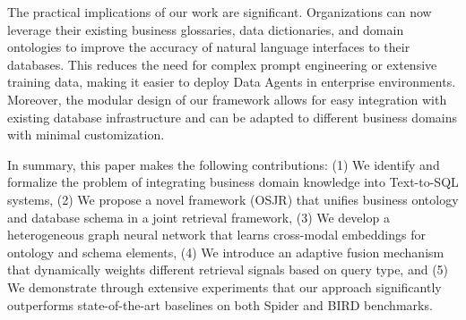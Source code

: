 \documentclass[sigconf, nonatbib]{acmart}
\begin{document}
The practical implications of our work are significant. Organizations can now leverage their existing business glossaries, data dictionaries, and domain ontologies to improve the accuracy of natural language interfaces to their databases. This reduces the need for complex prompt engineering or extensive training data, making it easier to deploy Data Agents in enterprise environments. Moreover, the modular design of our framework allows for easy integration with existing database infrastructure and can be adapted to different business domains with minimal customization.

In summary, this paper makes the following contributions: (1) We identify and formalize the problem of integrating business domain knowledge into Text-to-SQL systems, (2) We propose a novel framework (OSJR) that unifies business ontology and database schema in a joint retrieval framework, (3) We develop a heterogeneous graph neural network that learns cross-modal embeddings for ontology and schema elements, (4) We introduce an adaptive fusion mechanism that dynamically weights different retrieval signals based on query type, and (5) We demonstrate through extensive experiments that our approach significantly outperforms state-of-the-art baselines on both Spider and BIRD benchmarks.



\end{document}
